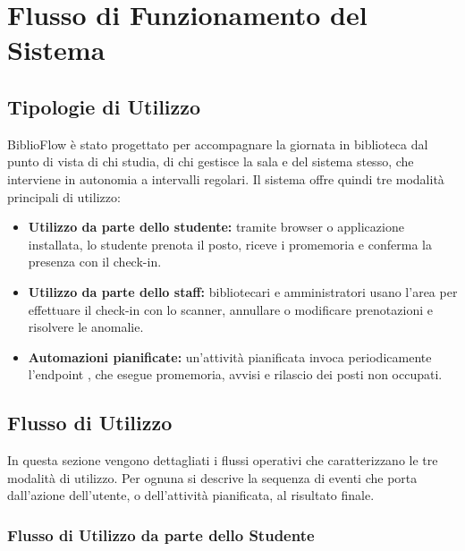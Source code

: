 \documentclass[11pt,a4paper,oneside,openany]{book}
\begin{document}
\chapter{Flusso di Funzionamento del Sistema}

\section{Tipologie di Utilizzo}

BiblioFlow è stato progettato per accompagnare la giornata in biblioteca dal
punto di vista di chi studia, di chi gestisce la sala e del sistema stesso,
che interviene in autonomia a intervalli regolari. Il sistema offre quindi tre
modalità principali di utilizzo:
\begin{itemize}
  \item \textbf{Utilizzo da parte dello studente:} tramite browser o
        applicazione installata, lo studente prenota il posto, riceve i
        promemoria e conferma la presenza con il check-in.
  \item \textbf{Utilizzo da parte dello staff:} bibliotecari e amministratori
        usano l'area  per effettuare il check-in con lo scanner,
        annullare o modificare prenotazioni e risolvere le anomalie.
  \item \textbf{Automazioni pianificate:} un'attività pianificata invoca
        periodicamente l'endpoint , che esegue
        promemoria, avvisi e rilascio dei posti non occupati.
\end{itemize}

\section{Flusso di Utilizzo}

In questa sezione vengono dettagliati i flussi operativi che caratterizzano le
tre modalità di utilizzo. Per ognuna si descrive la sequenza di eventi che
porta dall'azione dell'utente, o dell'attività pianificata, al risultato
finale.

\subsection{Flusso di Utilizzo da parte dello Studente}
\end{document}
